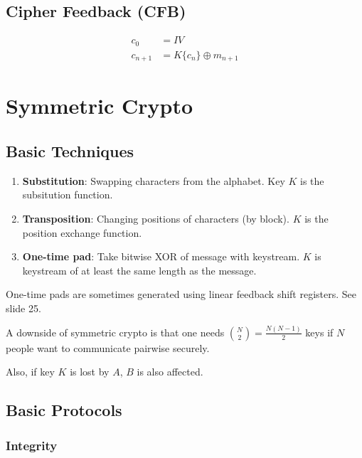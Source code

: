 \documentclass{article}
\begin{document}
\subsection{Cipher Feedback (CFB)}

\begin{align*}
  c_0 &= IV \\
  c_{n+1} &= K\{c_n\} \oplus m_{n+1}
\end{align*}

\section{Symmetric Crypto}

\subsection{Basic Techniques}

\begin{enumerate}

  \item \textbf{Substitution}: Swapping characters from the alphabet. Key $K$
    is the subsitution function.

  \item \textbf{Transposition}: Changing positions of characters (by block).
    $K$ is the position exchange function.

  \item \textbf{One-time pad}: Take bitwise XOR of message with keystream.
    $K$ is keystream of at least the same length as the message.

\end{enumerate}

One-time pads are sometimes generated using linear feedback shift registers. See
slide 25.

A downside of symmetric crypto is that one needs ${N \choose 2}
= \frac{N(N-1)}{2}$ keys if $N$ people want to communicate pairwise securely.

Also, if key $K$ is lost by $A$, $B$ is also affected.

\subsection{Basic Protocols}

\subsubsection{Integrity}
\end{document}
